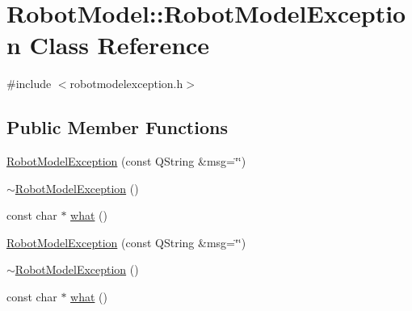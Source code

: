 \hypertarget{class_robot_model_1_1_robot_model_exception}{
\section{RobotModel::RobotModelException Class Reference}
\label{class_robot_model_1_1_robot_model_exception}
}


{\ttfamily \#include $<$robotmodelexception.h$>$}\subsection*{Public Member Functions}
\begin{DoxyCompactItemize}
\item 
\hyperlink{class_robot_model_1_1_robot_model_exception_a0a74e3836cfe0d931c971c94f0c393fa}{RobotModelException} (const QString \&msg=\char`\"{}\char`\"{})
\item 
\hyperlink{class_robot_model_1_1_robot_model_exception_a878614596085eba37b684ecb8d4dfd49}{$\sim$RobotModelException} ()
\item 
const char $\ast$ \hyperlink{class_robot_model_1_1_robot_model_exception_a96661f7c3b0cbb9c815b23c1eb315912}{what} ()
\item 
\hyperlink{class_robot_model_1_1_robot_model_exception_a761dc06deedf762507644ba4f5bfd7ca}{RobotModelException} (const QString \&msg=\char`\"{}\char`\"{})
\item 
\hyperlink{class_robot_model_1_1_robot_model_exception_ae3df586756f02b8658c6c7234e92e9c0}{$\sim$RobotModelException} ()
\item 
const char $\ast$ \hyperlink{class_robot_model_1_1_robot_model_exception_a1a9e091d897bf368a812f2d1dbd96382}{what} ()
\end{DoxyCompactItemize}


